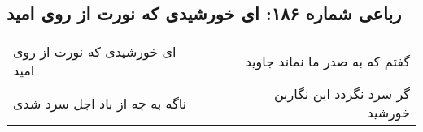 \begin{center}
\section*{رباعی شماره ۱۸۶: ای خورشیدی که نورت از روی امید}
\label{sec:sh186}
\begin{longtable}{l p{0.5cm} r}
ای خورشیدی که نورت از روی امید
&&
گفتم که به صدر ما نماند جاوید
\\
ناگه به چه از باد اجل سرد شدی
&&
گر سرد نگردد این نگارین خورشید
\\
\end{longtable}
\end{center}
